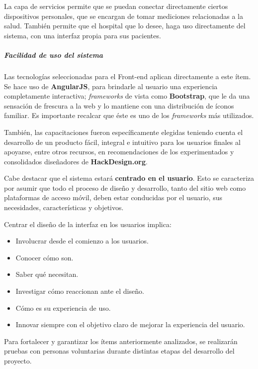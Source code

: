    La capa de servicios permite que se puedan conectar directamente ciertos dispositivos personales, que se encargan de tomar mediciones relacionadas a la salud.
    También permite que el hospital que lo desee, haga uso directamente del sistema, con una interfaz propia para sus pacientes.
    

\subparagraph{Facilidad de uso del sistema}
    
    Las tecnologías seleccionadas para el Front-end aplican directamente a este ítem.
    Se hace uso de \textbf{AngularJS}, para brindarle al usuario una experiencia completamente interactiva; \textit{frameworks} de vista como \textbf{Bootstrap}, que le da una sensación de frescura a la web y lo mantiene con una distribución de íconos familiar.
    Es importante recalcar que éste es uno de los \textit{frameworks} más utilizados.
    
    También, las capacitaciones fueron específicamente elegidas teniendo cuenta el desarrollo de un producto fácil, integral e intuitivo para los usuarios finales al apoyarse, entre otros recursos, en recomendaciones de los experimentados y consolidados diseñadores de \textbf{HackDesign.org}.
    
    Cabe destacar que el sistema estará \textbf{centrado en el usuario}.
    Esto se caracteriza por asumir que todo el proceso de diseño y desarrollo, tanto del sitio web como plataformas de acceso móvil, deben estar conducidas por el usuario, sus necesidades, características y objetivos.

	Centrar el diseño de la interfaz en los usuarios implica:
	\begin{itemize}
		\item Involucrar desde el comienzo a los usuarios.
		\item Conocer cómo son.
		\item Saber qué necesitan.
		\item Investigar cómo reaccionan ante el diseño.
		\item Cómo es su experiencia de uso.
		\item Innovar siempre con el objetivo claro de mejorar la experiencia del usuario.
	\end{itemize}
	Para fortalecer y garantizar los ítems anteriormente analizados, se realizarán pruebas con personas voluntarias durante distintas etapas del desarrollo del proyecto.%


